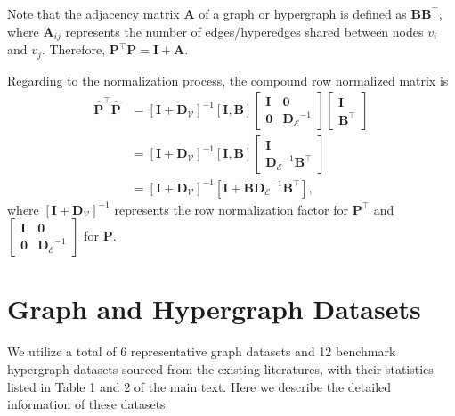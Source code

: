 \documentclass[review]{elsarticle}
\begin{document}
Note that the adjacency matrix $\mathbf{A}$ of a graph or hypergraph is defined as $\mathbf{B}\mathbf{B}^\top$, where $\mathbf{A}_{ij}$ represents the number of edges/hyperedges shared between nodes $v_i$ and $v_j$. Therefore, $\mathbf{P}^{\top}\mathbf{P}=\mathbf{I}+\mathbf{A}$.

Regarding to the normalization process, the compound row normalized matrix is
$$
\begin{aligned}\hat{\mathbf{P}}^{\top}\hat{\mathbf{P}}&=\left[\mathbf{I}+\mathbf{D}_\mathcal{V}\right]^{-1}\left[\mathbf{I},\mathbf{B}\right]\left[\begin{array}{cc}{\mathbf{I}}&\mathbf{0}\\\mathbf{0}&{\mathbf{D}_\mathcal{E}}^{-1}\end{array}\right]{\left[\begin{matrix}{\mathbf{I}}\\{\mathbf{B}^{\top}}\end{matrix}\right]}\\
&=\left[\mathbf{I}+\mathbf{D}_\mathcal{V}\right]^{-1}\left[\mathbf{I},\mathbf{B}\right]\left[\begin{array}{c}{\mathbf{I}}\\{\mathbf{D}_\mathcal{E}}^{-1}\mathbf{B}^{\top}\end{array}\right]\\
&=\left[\mathbf{I}+\mathbf{D}_\mathcal{V}\right]^{-1}\left[\mathbf{I}+\mathbf{B}{\mathbf{D}_\mathcal{E}}^{-1}\mathbf{B}^{\top}\right],\end{aligned}
$$
where $\left[\mathbf{I}+\mathbf{D}_\mathcal{V}\right]^{-1}$ represents the row normalization factor for $\mathbf{P}^{\top}$ and $\left[\begin{array}{cc}{\mathbf{I}}&\mathbf{0}\\\mathbf{0}&{\mathbf{D}_\mathcal{E}}^{-1}\end{array}\right]$ for $\mathbf{P}$.

\section{Graph and Hypergraph Datasets}

We utilize a total of 6 representative graph datasets and 12 benchmark hypergraph datasets sourced from the existing literatures, with their statistics listed in Table 1 and 2 of the main text. Here we describe the detailed information of these datasets.
\end{document}
